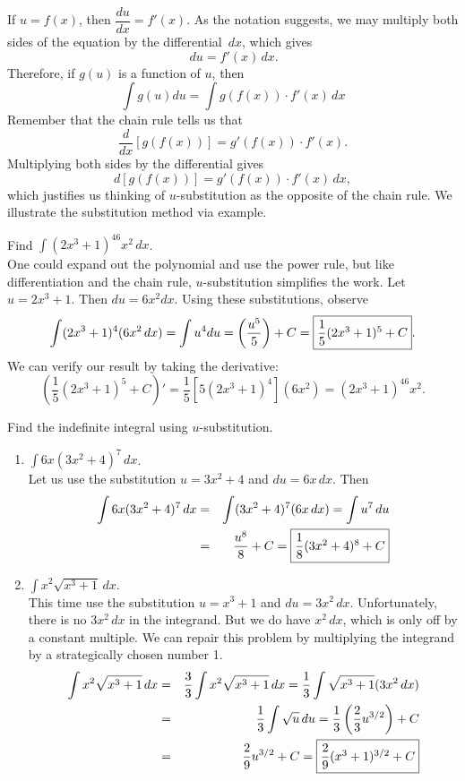 \documentclass{book}
\newcommand{\dx}{\,dx}
\newcommand{\du}{\,du}
\newcommand{\dint}{\displaystyle \int}
\begin{document}
If $u = f(x)$, then $\dfrac{du}{dx} = f'(x)$. As the notation suggests, we may multiply both sides of the equation by the differential $\dx$, which gives \[\du = f'(x)\dx.\] Therefore, if $g(u)$ is a function of $u$, then \begin{equation} \int g(u)du = \int g(f(x))\cdot f'(x)\dx\end{equation} Remember that the chain rule tells us that \[\dfrac{d}{dx}[g(f(x))] = g'(f(x))\cdot f'(x).\] Multiplying both sides by the differential gives \[d[g(f(x))] = g'(f(x))\cdot f'(x)\dx,\] which justifies us thinking of $u$-substitution as the opposite of the chain rule. We illustrate the substitution method via example.

\begin{Exam} Find $\dint(2x^3+1)^46x^2\dx$.\\

One could expand out the polynomial and use the power rule, but like differentiation and the chain rule, $u$-substitution simplifies the work. Let $u = 2x^3+1$. Then $du = 6x^2dx$. Using these substitutions, observe
\[\int(2x^3+1)^4(6x^2\dx) =  \int u^4 du = \left(\dfrac{u^5}{5}\right) + C = \fbox{$\dfrac{1}{5}(2x^3+1)^5 + C$}.\] We can verify our result by taking the derivative: \[\left( \dfrac{1}{5}(2x^3+1)^5 + C\right)' =  \dfrac{1}{5}\left[5(2x^3+1)^4\right](6x^2) = (2x^3+1)^46x^2. \]
\end{Exam}\vs

\begin{Exam} Find the indefinite integral using $u$-substitution.
\begin{enumerate}
\item $\dint 6x(3x^2+4)^7\dx$.\\

Let us use the substitution $u = 3x^2+4$ and $du = 6x\dx$. Then
\begin{eqnarray*}
\int 6x(3x^2+4)^7\dx &=& \int(3x^2+4)^7(6x\dx) = \int u^7\du\\
&=& \dfrac{u^8}{8} + C = \fbox{$\dfrac{1}{8}(3x^2+4)^8 + C$}
\end{eqnarray*}

\item $\dint x^2\sqrt{x^3+1}\dx$.\\

This time use the substitution $u = x^3 + 1$ and $du = 3x^2\dx$. Unfortunately, there is no $3x^2\dx$ in the integrand. But we do have $x^2\dx$, which is only off by a constant multiple. We can repair this problem by multiplying the integrand by a strategically chosen number 1.
\begin{eqnarray*}
\int x^2\sqrt{x^3+1}\dx &=& \dfrac{3}{3}\int x^2\sqrt{x^3+1}\dx = \dfrac{1}{3}\int \sqrt{x^3+1}(3x^2\dx)\\
&=& \dfrac{1}{3}\int \sqrt{u}\du = \dfrac{1}{3}\left(\dfrac{2}{3}u^{3/2}\right)  + C\\
&=& \dfrac{2}{9}u^{3/2} + C = \fbox{$\dfrac{2}{9}(x^3+1)^{3/2} + C$}
\end{eqnarray*}
\end{enumerate}
\end{Exam}\vs
\end{document}
